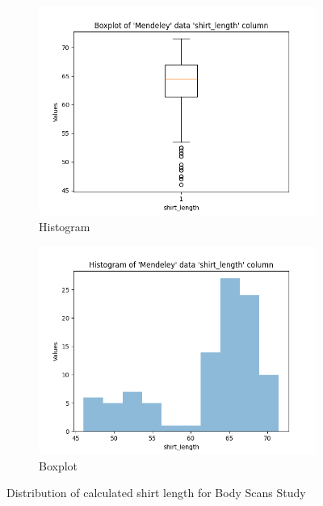 \begin{figure}[htb]
    \centering
    \begin{subfigure}[b]{0.45\textwidth}
        \centering
        \includegraphics[width=\textwidth]{Images/Mendeley_shirt_length_Boxplot.png}
        \caption{Histogram}
    \end{subfigure}
    \hfill
    \begin{subfigure}[b]{0.45\textwidth}
        \centering
        \includegraphics[width=\textwidth]{Images/Mendeley_shirt_length_Hist.png}
        \caption{Boxplot}
    \end{subfigure}
    \caption{Distribution of calculated shirt length for Body Scans Study}
\end{figure}

